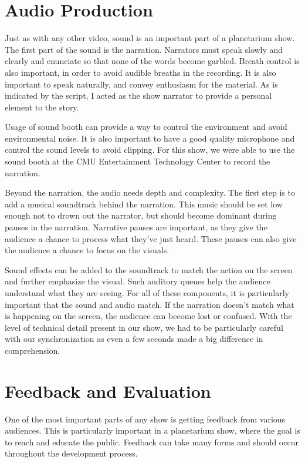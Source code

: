 \section{Audio Production}

Just as with any other video, sound is an important part of a planetarium show. 
The first part of the sound is the narration. Narrators must speak slowly and clearly and enunciate so that none of the words become garbled. Breath control is also important, in order to avoid audible breaths in the recording. It is also important to speak naturally, and convey enthusiasm for the material. As is indicated by the script, I acted as the show narrator to provide a personal element to the story. 

Usage of sound booth can provide a way to control the environment and avoid environmental noise. It is also important to have a good quality microphone and control the sound levels to avoid clipping. For this show, we were able to use the sound booth at the CMU Entertainment Technology Center to record the narration.  

Beyond the narration, the audio needs depth and complexity. The first step is to add a musical soundtrack behind the narration. This music should be set low enough not to drown out the narrator, but should become dominant during pauses in the narration. Narrative pauses are important, as they give the audience a chance to process what they've just heard. These pauses can also give the audience a chance to focus on the visuals. 

Sound effects can be added to the soundtrack to match the action on the screen and further emphasize the visual. Such auditory queues help the audience understand what they are seeing. For all of these components, it is particularly important that the sound and audio match. If the narration doesn't match what is happening on the screen, the audience can become lost or confused. With the level of technical detail present in our show, we had to be particularly careful with our synchronization as even a few seconds made a big difference in comprehension. 


\section{Feedback and Evaluation}

One of the most important parts of any show is getting feedback from various audiences. This is particularly important in a planetarium show, where the goal is to reach and educate the public. Feedback can take many forms and should occur throughout the development process. 


